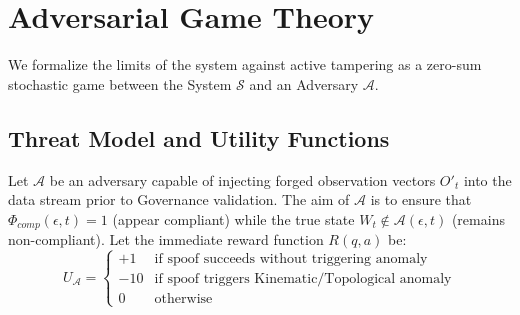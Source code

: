 \documentclass[conference]{IEEEtran}
\newcommand{\Sstate}{\mathcal{S}} %
\newcommand{\Auth}{\mathcal{A}} %
\begin{document}
\section{Adversarial Game Theory}

We formalize the limits of the system against active tampering as a zero-sum stochastic game between the System $\Sstate$ and an Adversary $\mathcal{A}$.

\subsection{Threat Model and Utility Functions}
Let $\mathcal{A}$ be an adversary capable of injecting forged observation vectors $O'_{t}$ into the data stream prior to Governance validation. The aim of $\mathcal{A}$ is to ensure that $\Phi_{comp}(\epsilon, t) = 1$ (appear compliant) while the true state $W_t \notin \Auth(\epsilon, t)$ (remains non-compliant). Let the immediate reward function $R(q, a)$ be:
\begin{equation}
U_\mathcal{A} = \begin{cases} 
+1 & \text{if spoof succeeds without triggering anomaly} \\
-10 & \text{if spoof triggers Kinematic/Topological anomaly} \\
0 & \text{otherwise} 
\end{cases}
\end{equation}
\end{document}
